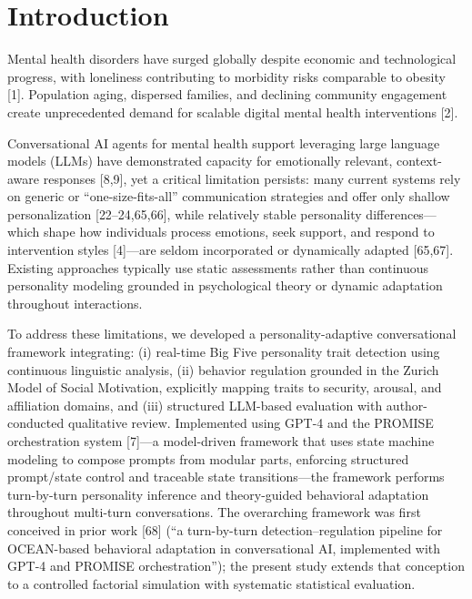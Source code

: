 \documentclass[apajournal,article,submit,moreauthors]{Definitions/mdpi}
\begin{document}
\section{Introduction}\label{introduction}

Mental health disorders have surged globally despite economic and technological progress, with loneliness contributing to morbidity risks comparable to obesity {[}1{]}. Population aging, dispersed families, and declining community engagement create unprecedented demand for scalable digital mental health interventions {[}2{]}.

Conversational AI agents for mental health support leveraging large language models (LLMs) have demonstrated capacity for emotionally relevant, context-aware responses {[}8,9{]}, yet a critical limitation persists: many current systems rely on generic or ``one-size-fits-all'' communication strategies and offer only shallow personalization {[}22--24,65,66{]}, while relatively stable personality differences---which shape how individuals process emotions, seek support, and respond to intervention styles {[}4{]}---are seldom incorporated or dynamically adapted {[}65,67{]}. Existing approaches typically use static assessments rather than continuous personality modeling grounded in psychological theory or dynamic adaptation throughout interactions.

To address these limitations, we developed a personality-adaptive conversational framework integrating: (i) real-time Big Five personality trait detection using continuous linguistic analysis, (ii) behavior regulation grounded in the Zurich Model of Social Motivation, explicitly mapping traits to security, arousal, and affiliation domains, and (iii) structured LLM-based evaluation with author-conducted qualitative review. Implemented using GPT-4 and the PROMISE orchestration system {[}7{]}---a model-driven framework that uses state machine modeling to compose prompts from modular parts, enforcing structured prompt/state control and traceable state transitions---the framework performs turn-by-turn personality inference and theory-guided behavioral adaptation throughout multi-turn conversations. The overarching framework was first conceived in prior work {[}68{]} (``a turn-by-turn detection--regulation pipeline for OCEAN-based behavioral adaptation in conversational AI, implemented with GPT-4 and PROMISE orchestration''); the present study extends that conception to a controlled factorial simulation with systematic statistical evaluation.
\end{document}

